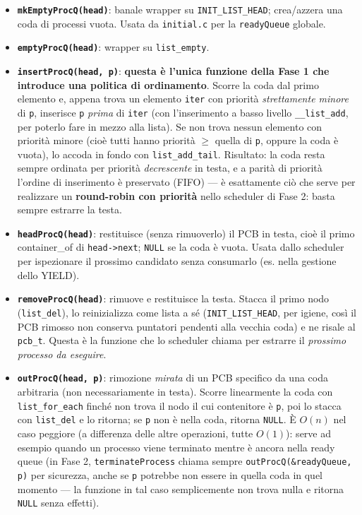 \documentclass[11pt,a4paper]{article}
\newcommand{\code}[1]{\texttt{#1}}
\newcommand{\func}[1]{\textbf{\texttt{#1}}}
\begin{document}
\begin{itemize}
\item \func{mkEmptyProcQ(head)}: banale wrapper su \code{INIT\_LIST\_HEAD};
  crea/azzera una coda di processi vuota. Usata da \code{initial.c} per la
  \code{readyQueue} globale.
\item \func{emptyProcQ(head)}: wrapper su \code{list\_empty}.
\item \func{insertProcQ(head, p)}: \textbf{questa è l'unica funzione della
  Fase 1 che introduce una politica di ordinamento}. Scorre la coda dal
  primo elemento e, appena trova un elemento \code{iter} con priorità
  \emph{strettamente minore} di \code{p}, inserisce \code{p} \emph{prima} di
  \code{iter} (con l'inserimento a basso livello \code{\_\_list\_add}, per
  poterlo fare in mezzo alla lista). Se non trova nessun elemento con
  priorità minore (cioè tutti hanno priorità $\ge$ quella di \code{p}, oppure
  la coda è vuota), lo accoda in fondo con \code{list\_add\_tail}.
  Risultato: la coda resta sempre ordinata per priorità
  \emph{decrescente} in testa, e a parità di priorità l'ordine di
  inserimento è preservato (FIFO) --- è esattamente ciò che serve per
  realizzare un \textbf{round-robin con priorità} nello scheduler di Fase 2:
  basta sempre estrarre la testa.
\item \func{headProcQ(head)}: restituisce (senza rimuoverlo) il PCB in
  testa, cioè il primo container\_of di \code{head->next}; \code{NULL} se
  la coda è vuota. Usata dallo scheduler per ispezionare il prossimo
  candidato senza consumarlo (es. nella gestione dello YIELD).
\item \func{removeProcQ(head)}: rimuove e restituisce la testa. Stacca il
  primo nodo (\code{list\_del}), lo reinizializza come lista a sé
  (\code{INIT\_LIST\_HEAD}, per igiene, così il PCB rimosso non conserva
  puntatori pendenti alla vecchia coda) e ne risale al \code{pcb\_t}.
  Questa è la funzione che lo scheduler chiama per estrarre il
  \emph{prossimo processo da eseguire}.
\item \func{outProcQ(head, p)}: rimozione \emph{mirata} di un PCB
  specifico da una coda arbitraria (non necessariamente in testa). Scorre
  linearmente la coda con \code{list\_for\_each} finché non trova il nodo il
  cui contenitore è \code{p}, poi lo stacca con \code{list\_del} e lo
  ritorna; se \code{p} non è nella coda, ritorna \code{NULL}. È $O(n)$ nel
  caso peggiore (a differenza delle altre operazioni, tutte $O(1)$): serve
  ad esempio quando un processo viene terminato mentre è ancora nella ready
  queue (in Fase 2, \code{terminateProcess} chiama sempre
  \code{outProcQ(\&readyQueue, p)} per sicurezza, anche se \code{p} potrebbe
  non essere in quella coda in quel momento --- la funzione in tal caso
  semplicemente non trova nulla e ritorna \code{NULL} senza effetti).
\end{itemize}
\end{document}
